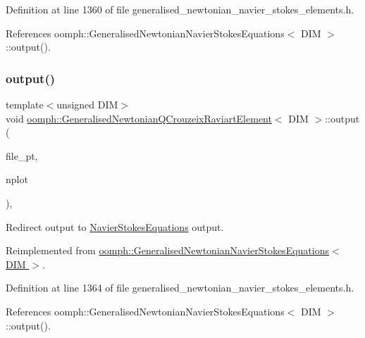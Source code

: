 Definition at line 1360 of file generalised\+\_\+newtonian\+\_\+navier\+\_\+stokes\+\_\+elements.\+h.



References oomph\+::\+Generalised\+Newtonian\+Navier\+Stokes\+Equations$<$ D\+I\+M $>$\+::output().

\mbox{\label{classoomph_1_1GeneralisedNewtonianQCrouzeixRaviartElement_aa6119cf023b202657222a8d6ee86612c}} 
\subsubsection{\texorpdfstring{output()}{output()}\hspace{0.1cm}{\footnotesize\ttfamily [4/4]}}
{\footnotesize\ttfamily template$<$unsigned D\+IM$>$ \\
void \hyperlink{classoomph_1_1GeneralisedNewtonianQCrouzeixRaviartElement}{oomph\+::\+Generalised\+Newtonian\+Q\+Crouzeix\+Raviart\+Element}$<$ D\+IM $>$\+::output (\begin{DoxyParamCaption}\item[{F\+I\+LE $\ast$}]{file\+\_\+pt,  }\item[{const unsigned \&}]{nplot }\end{DoxyParamCaption})\hspace{0.3cm}{\ttfamily [inline]}, {\ttfamily [virtual]}}



Redirect output to \hyperlink{classoomph_1_1NavierStokesEquations}{Navier\+Stokes\+Equations} output. 



Reimplemented from \hyperlink{classoomph_1_1GeneralisedNewtonianNavierStokesEquations_a4cea0e2de7ce23a994bda1ee87222d21}{oomph\+::\+Generalised\+Newtonian\+Navier\+Stokes\+Equations$<$ D\+I\+M $>$}.



Definition at line 1364 of file generalised\+\_\+newtonian\+\_\+navier\+\_\+stokes\+\_\+elements.\+h.



References oomph\+::\+Generalised\+Newtonian\+Navier\+Stokes\+Equations$<$ D\+I\+M $>$\+::output().

